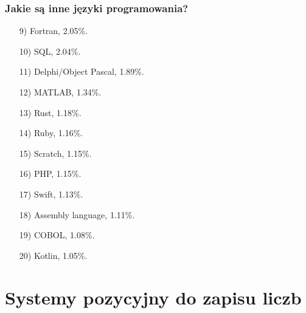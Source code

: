 \documentclass[10pt,t]{beamer}
\begin{document}
\begin{frame}
  \frametitle{Jakie są inne języki programowania?}


  \begin{itemize}

  \item[9)] Fortran, 2.05\%.

  \item[10)] SQL, 2.04\%.

  \item[11)] Delphi/Object Pascal, 1.89\%.

  \item[12)] MATLAB, 1.34\%.

  \item[13)] Rust, 1.18\%.

  \item[14)] Ruby, 1.16\%.

  \item[15)] Scratch, 1.15\%.

  \item[16)] PHP, 1.15\%.

  \item[17)] Swift, 1.13\%.

  \item[18)] Assembly language, 1.11\%.

  \item[19)] COBOL, 1.08\%.

  \item[20)] Kotlin, 1.05\%.

  \end{itemize}

\end{frame}















\section{Systemy pozycyjny do zapisu liczb}
\end{document}
